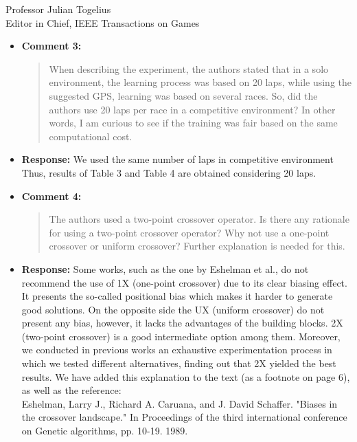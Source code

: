 \documentclass[10pt]{letter} %
\begin{document}
\begin{letter}{Professor Julian Togelius \\ Editor in Chief, IEEE Transactions on Games}
\begin{enumerate}
\begin{itemize}
\begin{itemize}
	\end{itemize}			
		\item {\bf Comment 3:}
		\begin{quote}
		When describing the experiment, the authors stated that in a solo environment, the learning process was based on 20 laps, while using the suggested GPS, learning was based on several races. So, did the authors use 20 laps per race in a competitive environment? In other words, I am curious to see if the training was fair based on the same computational cost.
			\end{quote}	
		\item {\bf Response:} 
		We used the same number of laps in competitive environment Thus, results of Table 3 and Table 4 are obtained considering 20 laps.
		\item {\bf Comment 4:}
		\begin{quote}
The authors used a two-point crossover operator. Is there any rationale for using a two-point crossover operator? Why not use a one-point crossover or uniform crossover? Further explanation is needed for this.
			\end{quote}	
		\item {\bf Response:} 
Some works, such as the one by Eshelman et al., do not recommend the use of 1X (one-point crossover) due to its clear biasing effect. It presents the so-called positional bias which makes it harder to generate good solutions. On the opposite side the UX (uniform crossover) do not present any bias, however, it lacks the advantages of the building blocks. 2X (two-point crossover) is a good intermediate option among them. Moreover, we conducted in previous works an exhaustive experimentation process in which we tested different alternatives, finding out that 2X yielded the best results.
We have added this explanation to the text (as a footnote on page 6), as well as the reference:\\
Eshelman, Larry J., Richard A. Caruana, and J. David Schaffer. "Biases in the crossover landscape." In Proceedings of the third international conference on Genetic algorithms, pp. 10-19. 1989.


\end{itemize}
\end{enumerate}
\end{letter}
\end{document}
